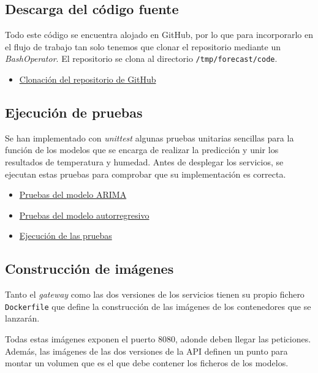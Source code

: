 \subsection{Descarga del código fuente}
Todo este código se encuentra alojado en GitHub, por lo que para incorporarlo
en el flujo de trabajo tan solo tenemos que clonar el repositorio mediante un
\textit{BashOperator}. El repositorio se clona al directorio \lstinline{/tmp/forecast/code}.

\begin{itemize}
    \item\href{
        https://github.com/Varrrro/forecast/blob/master/airflow/tasks.py#L147-L152
    }{Clonación del repositorio de GitHub}
\end{itemize}

\subsection{Ejecución de pruebas}
Se han implementado con \textit{unittest} algunas pruebas unitarias sencillas
para la función de los modelos que se encarga de realizar la predicción y
unir los resultados de temperatura y humedad. Antes de desplegar los servicios,
se ejecutan estas pruebas para comprobar que su implementación es correcta.

\begin{itemize}
    \item\href{
        https://github.com/Varrrro/forecast/blob/master/tests/test_arima.py
    }{Pruebas del modelo ARIMA}
    \item\href{
        https://github.com/Varrrro/forecast/blob/master/tests/test_autoreg.py
    }{Pruebas del modelo autorregresivo}
    \item\href{
        https://github.com/Varrrro/forecast/blob/master/airflow/tasks.py#L154-L159
    }{Ejecución de las pruebas}
\end{itemize}

\subsection{Construcción de imágenes}
Tanto el \textit{gateway} como las dos versiones de los servicios tienen su
propio fichero \lstinline{Dockerfile} que define la construcción de las
imágenes de los contenedores que se lanzarán.

Todas estas imágenes exponen el puerto 8080, adonde deben llegar las peticiones.
Además, las imágenes de las dos versiones de la API definen un punto para
montar un volumen que es el que debe contener los ficheros de los modelos.

